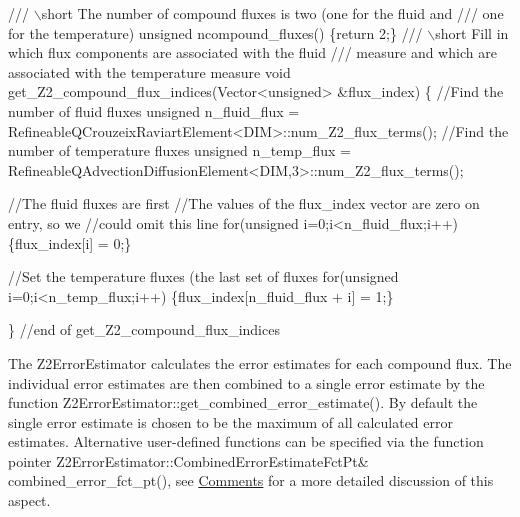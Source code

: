  
\begin{DoxyCodeInclude}
 \textcolor{comment}{/// \(\backslash\)short The number of compound fluxes is two (one for the fluid and}
\textcolor{comment}{ /// one for the temperature)}
\textcolor{comment}{} \textcolor{keywordtype}{unsigned} ncompound\_fluxes() \{\textcolor{keywordflow}{return} 2;\}
\textcolor{comment}{}
\textcolor{comment}{ /// \(\backslash\)short Fill in which flux components are associated with the fluid}
\textcolor{comment}{ /// measure and which are associated with the temperature measure}
\textcolor{comment}{} \textcolor{keywordtype}{void} get\_Z2\_compound\_flux\_indices(Vector<unsigned> &flux\_index) 
  \{
   \textcolor{comment}{//Find the number of fluid fluxes}
   \textcolor{keywordtype}{unsigned} n\_fluid\_flux = 
    RefineableQCrouzeixRaviartElement<DIM>::num\_Z2\_flux\_terms();
   \textcolor{comment}{//Find the number of temperature fluxes}
   \textcolor{keywordtype}{unsigned} n\_temp\_flux =  
    RefineableQAdvectionDiffusionElement<DIM,3>::num\_Z2\_flux\_terms();

   \textcolor{comment}{//The fluid fluxes are first }
   \textcolor{comment}{//The values of the flux\_index vector are zero on entry, so we}
   \textcolor{comment}{//could omit this line}
   \textcolor{keywordflow}{for}(\textcolor{keywordtype}{unsigned} i=0;i<n\_fluid\_flux;i++) \{flux\_index[i] = 0;\}

   \textcolor{comment}{//Set the temperature fluxes (the last set of fluxes}
   \textcolor{keywordflow}{for}(\textcolor{keywordtype}{unsigned} i=0;i<n\_temp\_flux;i++) \{flux\_index[n\_fluid\_flux + i] = 1;\}

  \} \textcolor{comment}{//end of get\_Z2\_compound\_flux\_indices}

\end{DoxyCodeInclude}


The {\ttfamily Z2\+Error\+Estimator} calculates the error estimates for each compound flux. The individual error estimates are then combined to a single error estimate by the function {\ttfamily Z2\+Error\+Estimator\+::get\+\_\+combined\+\_\+error\+\_\+estimate()}. By default the single error estimate is chosen to be the maximum of all calculated error estimates. Alternative user-\/defined functions can be specified via the function pointer {\ttfamily Z2\+Error\+Estimator\+::\+Combined\+Error\+Estimate\+Fct\+Pt\&} {\ttfamily combined\+\_\+error\+\_\+fct\+\_\+pt()}, see \hyperlink{index_comments}{Comments} for a more detailed discussion of this aspect.

